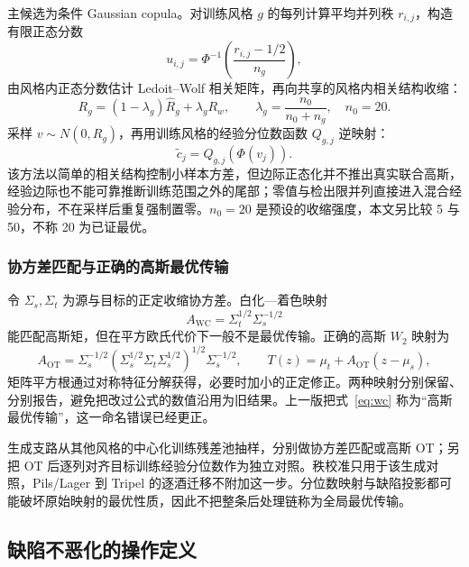 \documentclass[UTF8,a4paper,zihao=-4]{ctexart}
\numberwithin{figure}{section}
\numberwithin{table}{section}
\numberwithin{equation}{section}
\begin{document}
主候选为条件 Gaussian copula。对训练风格 $g$ 的每列计算平均并列秩 $r_{i,j}$，构造有限正态分数
\begin{equation}
u_{i,j}=\Phi^{-1}\left(\frac{r_{i,j}-1/2}{n_g}\right),
\label{eq:normal-score}
\end{equation}
由风格内正态分数估计 Ledoit--Wolf 相关矩阵，再向共享的风格内相关结构收缩：
\begin{equation}
R_g=(1-\lambda_g)\hat R_g+\lambda_g R_w,\qquad \lambda_g=\frac{n_0}{n_0+n_g},\quad n_0=20.
\label{eq:shrinkage}
\end{equation}
采样 $v\sim N(0,R_g)$，再用训练风格的经验分位数函数 $Q_{g,j}$ 逆映射：
\begin{equation}
\tilde c_j=Q_{g,j}\left(\Phi(v_j)\right).
\label{eq:copula}
\end{equation}
该方法以简单的相关结构控制小样本方差，但边际正态化并不推出真实联合高斯，经验边际也不能可靠推断训练范围之外的尾部；零值与检出限并列直接进入混合经验分布，不在采样后重复强制置零。$n_0=20$ 是预设的收缩强度，本文另比较 5 与 50，不称 20 为已证最优。

\subsubsection{协方差匹配与正确的高斯最优传输}

令 $\Sigma_s,\Sigma_t$ 为源与目标的正定收缩协方差。白化—着色映射
\begin{equation}
A_{\mathrm{WC}}=\Sigma_t^{1/2}\Sigma_s^{-1/2}
\label{eq:wc}
\end{equation}
能匹配高斯矩，但在平方欧氏代价下一般不是最优传输。正确的高斯 $W_2$ 映射\cite{peyre2019}为
\begin{equation}
A_{\mathrm{OT}}=\Sigma_s^{-1/2}\left(\Sigma_s^{1/2}\Sigma_t\Sigma_s^{1/2}\right)^{1/2}\Sigma_s^{-1/2},\qquad
T(z)=\mu_t+A_{\mathrm{OT}}\left(z-\mu_s\right),
\label{eq:ot}
\end{equation}
矩阵平方根通过对称特征分解获得，必要时加小的正定修正。两种映射分别保留、分别报告，避免把改过公式的数值沿用为旧结果。上一版把式~\eqref{eq:wc} 称为“高斯最优传输”，这一命名错误已经更正。

生成支路从其他风格的中心化训练残差池抽样，分别做协方差匹配或高斯 OT；另把 OT 后逐列对齐目标训练经验分位数作为独立对照。秩校准只用于该生成对照，Pils/Lager 到 Tripel 的逐酒迁移不附加这一步。分位数映射与缺陷投影都可能破坏原始映射的最优性质，因此不把整条后处理链称为全局最优传输。

\subsection{缺陷不恶化的操作定义}
\end{document}
